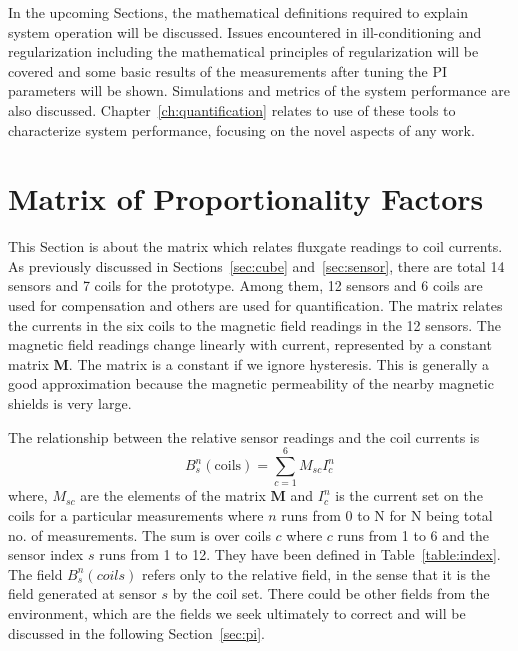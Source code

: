 In the upcoming Sections, the mathematical definitions required to explain system operation will be discussed. Issues encountered in ill-conditioning and regularization including the mathematical principles of regularization will be covered and some basic results of the measurements after tuning the PI parameters will be shown. Simulations and metrics of the system performance are also discussed. Chapter~\ref{ch:quantification} relates to use of these tools to characterize system performance, focusing on the novel aspects of any work.

\section{Matrix of Proportionality Factors}\label{sec:m}

This Section is about the matrix which relates fluxgate readings to coil currents. As previously discussed in Sections~\ref{sec:cube} and~\ref{sec:sensor}, there are total 14 sensors and 7 coils for the prototype. Among them, 12 sensors and 6 coils are used for compensation and others are used for quantification. The matrix relates the currents in the six coils to the magnetic field readings in the 12 sensors. The magnetic field readings change linearly with current, represented by a constant matrix $\bm{M}$.  The matrix is a constant if we ignore hysteresis.  This is generally a good approximation because the magnetic permeability of the nearby magnetic shields is very large.

The relationship between the relative sensor readings and the coil currents is
\begin{equation}\label{eq:B_coils}
    B_s^n(\mathrm{coils})=\sum_{c=1}^{6} M_{sc} I_c^n
\end{equation}
where, $M_{sc}$ are the elements of the matrix $\bm{M}$ and $I_c^n$ is the current set on the coils for a particular measurements where $n$ runs from 0 to N for N being total no. of measurements. The sum is over coils $c$ where $c$ runs from 1 to 6 and the sensor index $s$ runs from 1 to 12. They have been defined in Table~\ref{table:index}. The field $B_s^n(coils)$ refers only to the relative field, in the sense that it is the field generated at sensor $s$ by the coil set. There could be other fields from the environment, which are the fields we seek ultimately to correct and will be discussed in the following Section~\ref{sec:pi}.


